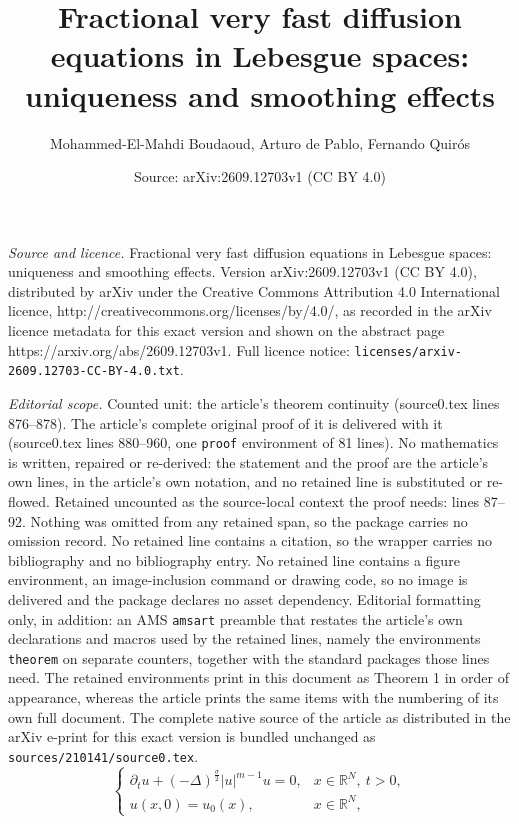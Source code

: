 \documentclass[10pt,a4paper]{amsart}
\title{Fractional very fast diffusion equations in Lebesgue spaces: uniqueness and smoothing effects}
\author{Mohammed-El-Mahdi Boudaoud, Arturo de Pablo, Fernando Quir\'os}
\date{Source: arXiv:2609.12703v1 (CC BY 4.0)}
\begin{document}
\maketitle

\noindent\emph{Source and licence.} Fractional very fast diffusion equations in Lebesgue spaces: uniqueness and smoothing effects. Version arXiv:2609.12703v1 (CC BY 4.0), distributed by arXiv under the Creative Commons Attribution 4.0 International licence, http://creativecommons.org/licenses/by/4.0/, as recorded in the arXiv licence metadata for this exact version and shown on the abstract page https://arxiv.org/abs/2609.12703v1. Full licence notice: \texttt{licenses/arxiv-2609.12703-CC-BY-4.0.txt}.\par\smallskip

\noindent\textit{Editorial scope.} Counted unit: the article's theorem continuity (source0.tex lines 876--878). The article's complete original proof of it is delivered with it (source0.tex lines 880--960, one \texttt{proof} environment of 81 lines). No mathematics is written, repaired or re-derived: the statement and the proof are the article's own lines, in the article's own notation, and no retained line is substituted or re-flowed.  Retained uncounted as the source-local context the proof needs: lines 87--92.  Nothing was omitted from any retained span, so the package carries no omission record.  No retained line contains a citation, so the wrapper carries no bibliography and no bibliography entry.  No retained line contains a figure environment, an image-inclusion command or drawing code, so no image is delivered and the package declares no asset dependency.  Editorial formatting only, in addition: an AMS \texttt{amsart} preamble that restates the article's own declarations and macros used by the retained lines, namely the environments \texttt{theorem} on separate counters, together with the standard packages those lines need.  The retained environments print in this document as Theorem 1 in order of appearance, whereas the article prints the same items with the numbering of its own full document.  The complete native source of the article as distributed in the arXiv e-print for this exact version is bundled unchanged as \texttt{sources/210141/source0.tex}.
\begin{equation}\label{eq:main}
    \begin{cases}
        \partial_t u+(-\Delta)^{\frac\sigma2}|u|^{m-1}u=0,&x\in \mathbb{R}^N,\ t>0,\\
        u(x,0)=u_0(x),&x\in\mathbb{R}^N,
    \end{cases}
\end{equation}
\end{document}
